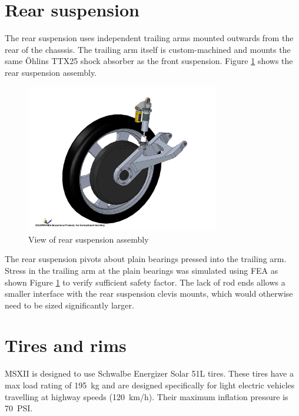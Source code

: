 \documentclass[10pt]{article}
\begin{document}
\section{Rear suspension}
The rear suspension uses independent trailing arms mounted outwards from the rear of the chasssis. The trailing arm itself is custom-machined and mounts the same \"Ohlins TTX25 shock absorber as the front suspension. Figure \ref{fig:rear-suspension} shows the rear suspension assembly.

\begin{figure}[H]
\centering
\includegraphics[width=0.75\textwidth]{figures/rear-suspension}
\caption{View of rear suspension assembly}
\label{fig:rear-suspension}
\end{figure}

The rear suspension pivots about plain bearings pressed into the trailing arm. Stress in the trailing arm at the plain bearings was simulated using FEA as shown Figure \ref{fig:rear-suspension} to verify sufficient safety factor. The lack of rod ends allows a smaller interface with the rear suspension clevis mounts, which would otherwise need to be sized significantly larger.

\section{Tires and rims}
MSXII is designed to use Schwalbe Energizer Solar 51L tires. These tires have a max load rating of \SI{195}{\kilo\gram} and are designed specifically for light electric vehicles travelling at highway speeds (\SI{120}{km/h}). Their maximum inflation pressure is \SI{70}{PSI}.
\end{document}
